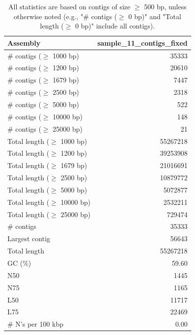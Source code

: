 \documentclass[12pt,a4paper]{article}
\begin{document}
\begin{table}[ht]
\begin{center}
\caption{All statistics are based on contigs of size $\geq$ 500 bp, unless otherwise noted (e.g., "\# contigs ($\geq$ 0 bp)" and "Total length ($\geq$ 0 bp)" include all contigs).}
\begin{tabular}{|l*{1}{|r}|}
\hline
Assembly & sample\_11\_contigs\_fixed \\ \hline
\# contigs ($\geq$ 1000 bp) & 35333 \\ \hline
\# contigs ($\geq$ 1200 bp) & 20610 \\ \hline
\# contigs ($\geq$ 1679 bp) & 7447 \\ \hline
\# contigs ($\geq$ 2500 bp) & 2318 \\ \hline
\# contigs ($\geq$ 5000 bp) & 522 \\ \hline
\# contigs ($\geq$ 10000 bp) & 148 \\ \hline
\# contigs ($\geq$ 25000 bp) & 21 \\ \hline
Total length ($\geq$ 1000 bp) & 55267218 \\ \hline
Total length ($\geq$ 1200 bp) & 39253908 \\ \hline
Total length ($\geq$ 1679 bp) & 21016691 \\ \hline
Total length ($\geq$ 2500 bp) & 10879772 \\ \hline
Total length ($\geq$ 5000 bp) & 5072877 \\ \hline
Total length ($\geq$ 10000 bp) & 2532211 \\ \hline
Total length ($\geq$ 25000 bp) & 729474 \\ \hline
\# contigs & 35333 \\ \hline
Largest contig & 56643 \\ \hline
Total length & 55267218 \\ \hline
GC (\%) & 59.60 \\ \hline
N50 & 1445 \\ \hline
N75 & 1165 \\ \hline
L50 & 11717 \\ \hline
L75 & 22469 \\ \hline
\# N's per 100 kbp & 0.00 \\ \hline
\end{tabular}
\end{center}
\end{table}
\end{document}
